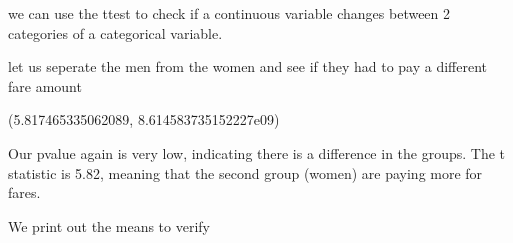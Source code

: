 \documentclass[letterpaper,10pt,english]{jupyterBook}
\begin{document}
\sphinxAtStartPar
we can use the t\sphinxhyphen{}test to check if a continuous variable changes between 2 categories of a categorical variable.

\sphinxAtStartPar
let us seperate the men from the women and see if they had to pay a different fare amount

\begin{sphinxVerbatim}[commandchars=\\\{\}]
   
    \PYG{p}{[}\PYG{p}{]}
    \PYG{p}{[}\PYG{p}{]}
 
\end{sphinxVerbatim}

\begin{sphinxVerbatim}[commandchars=\\\{\}]
(\PYGZhy{}5.817465335062089, 8.614583735152227e\PYGZhy{}09)
\end{sphinxVerbatim}

\sphinxAtStartPar
Our p\sphinxhyphen{}value again is very low, indicating there is a difference in the groups.
The t statistic is \sphinxhyphen{}5.82, meaning that the second group (women) are paying more for fares.

\sphinxAtStartPar
We print out the means to verify

\begin{sphinxVerbatim}[commandchars=\\\{\}]
\PYG{p}{[}\PYG{p}{]}
\PYG{p}{[}\PYG{p}{]}
\end{sphinxVerbatim}
\end{document}
